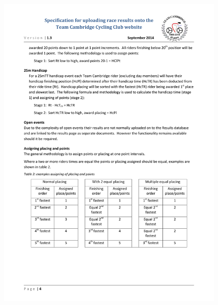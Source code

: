 \begin{figure}[H]
    \includegraphics[width=\textwidth]{./TeamCambridgeSpec/page4.pdf}
\end{figure}

